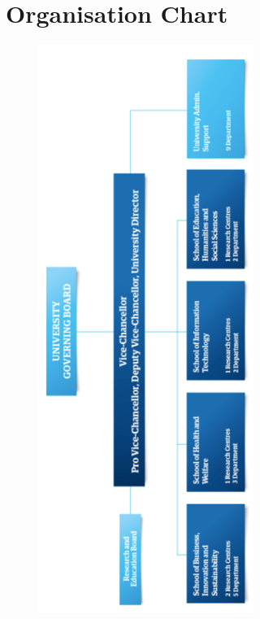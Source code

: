 \chapter{Organisation Chart}
\label{AppChart}

\begin{figure}[h!]
\begin{center}
\includegraphics[width=7cm]{Pictures/AppChart}
\end{center}
\end{figure}